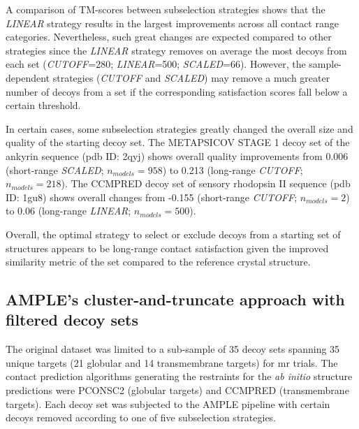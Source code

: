 A comparison of \textDelta TM-scores between subselection strategies shows that the \textit{LINEAR} strategy results in the largest improvements across all contact range categories. Nevertheless, such great changes are expected compared to other strategies since the \textit{LINEAR} strategy removes on average the most decoys from each set (\textit{CUTOFF}=280; \textit{LINEAR}=500; \textit{SCALED}=66). However, the sample-dependent strategies (\textit{CUTOFF} and \textit{SCALED}) may remove a much greater number of decoys from a set if the corresponding satisfaction scores fall below a certain threshold.

In certain cases, some subselection strategies greatly changed the overall size and quality of the starting decoy set. The METAPSICOV STAGE 1 decoy set of the ankyrin sequence (\gls{pdb} ID: 2qyj) shows overall quality improvements from 0.006 (short-range \textit{SCALED}; $n_{models}=958$) to 0.213 (long-range \textit{CUTOFF}; $n_{models}=218$). The CCMPRED decoy set of sensory rhodopsin II sequence (\gls{pdb} ID: 1gu8) shows overall changes from -0.155 (short-range \textit{CUTOFF}; $n_{models}=2$) to 0.06 (long-range \textit{LINEAR}; $n_{models}=500$).

Overall, the optimal strategy to select or exclude decoys from a starting set of structures appears to be long-range contact satisfaction given the improved similarity metric of the set compared to the reference crystal structure. 


\subsection{AMPLE's cluster-and-truncate approach with filtered decoy sets}
The original dataset was limited to a sub-sample of 35 decoy sets spanning 35 unique targets (21 globular and 14 transmembrane targets) for \gls{mr} trials. The contact prediction algorithms generating the restraints for the \textit{ab initio} structure predictions were PCONSC2 (globular targets) and CCMPRED (transmembrane targets). Each decoy set was subjected to the AMPLE pipeline with certain decoys removed according to one of five subselection strategies.

